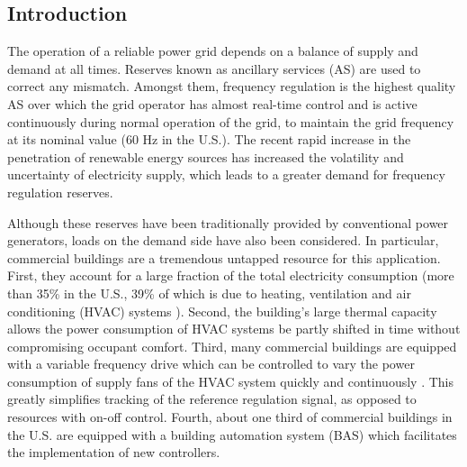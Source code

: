 %


\subsection{Introduction}\label{sec:introduction}

The operation of a reliable power grid depends on a balance of supply and demand at all times. 
Reserves known as ancillary services (AS) are used to correct any mismatch.
Amongst them, frequency regulation is the highest quality AS over which the grid operator has almost real-time control and is active continuously during normal operation of the grid, to maintain the grid frequency at its nominal value (60 Hz in the U.S.).
The recent rapid increase in the penetration of renewable energy sources has increased the volatility and uncertainty of electricity supply, which leads to a greater demand for frequency regulation reserves.

Although these reserves have been traditionally provided by conventional power generators, loads on the demand side have also been considered. 
In particular, commercial buildings are a tremendous untapped resource for this application. 
First, they account for a large fraction of the total electricity consumption (more than 35\% in the U.S., 39\% of which is due to heating, ventilation and air conditioning (HVAC) systems \cite{USenergy:2013}). 
Second, the building's large thermal capacity allows the power consumption of HVAC systems be partly shifted in time without compromising occupant comfort. 
Third, many commercial buildings are equipped with a variable frequency drive which can be controlled to vary the power consumption of supply fans of the HVAC system quickly and continuously \cite{Hao:2012demandresponse}. This greatly simplifies tracking of the reference regulation signal, as opposed to resources with on-off control.
Fourth, about one third of commercial buildings in the U.S. are equipped with a building automation system (BAS) \cite{Braun:2012} which facilitates the implementation of new controllers.

